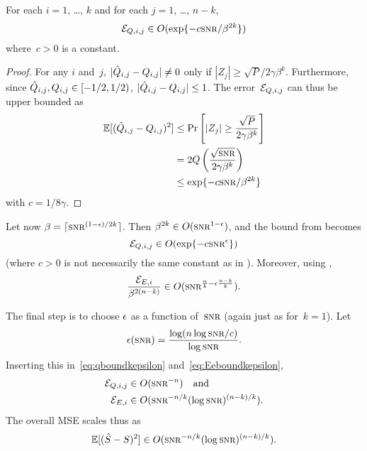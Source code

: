 \begin{lemma}
  \label{lem:eqboundk}
  For each $i = 1$, \dots, $k$ and for each $j = 1$, \dots, $n-k$,
  \begin{equation*}
    \Err_{Q,i,j} \in O(\exp\{-c \snr/\beta^{2k} \})
  \end{equation*}
  where~$c > 0$ is a constant.
\end{lemma}

\begin{proof}
  For any $i$ and~$j$, $| \hat{Q}_{i,j} - Q_{i,j}| \ne 0$ only if $|Z_j| \ge
  \sqrt{P} / 2 \gamma \beta^k$. Furthermore, since $\hat{Q}_{i,j}, Q_{i,j} \in
  [-1/2, 1/2)$, $|\hat{Q}_{i,j} - Q_{i,j}| \le 1$. The error~${\mathcal{E}}_{Q,i,j}$ can thus
  be upper bounded as
  \begin{align*}
    \E[(\Qh_{i,j} - Q_{i,j})^2] &\le \Pr\left[|Z_j| \ge \frac{\sqrt{P}}{2 \gamma
    \beta^k} \right] \\
    &= 2 Q\left( \frac{\sqrt\snr}{2\gamma\beta^k} \right) \\
    &\le \exp\{-c \snr / \beta^{2k} \}
  \end{align*}
  with $c = 1/8\gamma$.
\end{proof}


Let now $\beta = \lceil \snr^{(1-\e)/2k} \rceil$. Then $\beta^{2k} \in
O(\snr^{1-\e})$, and the bound from  becomes
\begin{equation}
  \label{eq:qboundkepsilon}
  \Err_{Q,i,j} \in O(\exp\{-c \snr^\e\})
\end{equation}
(where $c > 0$ is not necessarily the same constant as in ).
Moreover, using ,
\begin{equation}
  \label{eq:Eeboundkepsilon}
  \frac{\Err_{E,i}}{\beta^{2(n-k)}} \in O(\snr^{\frac{n}{k} - \e
  \frac{n-k}{k}}).
\end{equation}

The final step is to choose $\epsilon$ as a function of~$\snr$ (again just as
for~$k=1$). Let
\begin{equation*}
  \e(\snr) = \frac{\log(n \log\snr / c)}{\log\snr}.
\end{equation*}
Inserting this in~\eqref{eq:qboundkepsilon} and~\eqref{eq:Eeboundkepsilon}, 
\begin{align*}
  \Err_{Q,i,j} &\in O(\snr^{-n}) \quad\text{and} \\
  \Err_{E,i} &\in O(\snr^{-n/k} (\log\snr)^{(n-k)/k}).
\end{align*}
The overall MSE scales thus as
\begin{equation*}
  \mse \in O(\snr^{-n/k} (\log\snr)^{(n-k)/k}).
\end{equation*}

